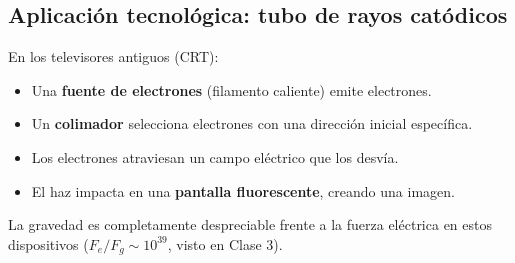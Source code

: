 \documentclass[12pt,a4paper]{article}
\begin{document}
\subsection{Aplicación tecnológica: tubo de rayos catódicos}

En los televisores antiguos (CRT):
\begin{itemize}[nosep]
  \item Una \textbf{fuente de electrones} (filamento caliente) emite
        electrones.
  \item Un \textbf{colimador} selecciona electrones con una dirección
        inicial específica.
  \item Los electrones atraviesan un campo eléctrico que los desvía.
  \item El haz impacta en una \textbf{pantalla fluorescente},
        creando una imagen.
\end{itemize}

\begin{notebox}
  La gravedad es completamente despreciable frente a la fuerza
  eléctrica en estos dispositivos ($F_e/F_g \sim 10^{39}$, visto en
  Clase 3).
\end{notebox}
\end{document}
